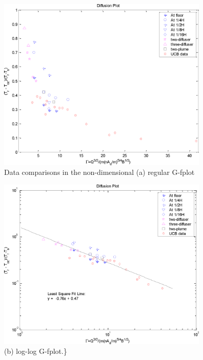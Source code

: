 \begin{figure}[hbtp] %
\centering
\includegraphics[width=0.9\textwidth, height=0.9\textheight, keepaspectratio=true]{media/image2469.png}
\caption{Data comparisons in the non-dimensional (a) regular G-fplot \protect \label{fig:data-comparisons-in-the-non-dimensional-a}}
\end{figure}

\begin{figure}[hbtp] %
\centering
\includegraphics[width=0.9\textwidth, height=0.9\textheight, keepaspectratio=true]{media/image2470.png}
\caption{(b) log-log G-fplot.\} \protect \label{fig:b-log-log-g-fplot.}}
\end{figure}

